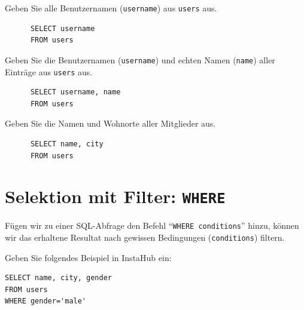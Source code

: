 \begin{myexercise}
  Geben Sie alle Benutzernamen (\texttt{username}) aus \texttt{users} aus.
  \begin{myanswer}
    \begin{lstlisting}
      SELECT username
      FROM users
      \end{lstlisting}
  \end{myanswer}
\end{myexercise}

\begin{myexercise}
  Geben Sie die Benutzernamen (\texttt{username}) und echten Namen (\texttt{name}) aller Einträge aus \texttt{users} aus.
  \begin{myanswer}
    \begin{lstlisting}
      SELECT username, name
      FROM users
    \end{lstlisting}
  \end{myanswer}
\end{myexercise}

\begin{myexercise}
  Geben Sie die Namen und Wohnorte aller Mitglieder aus.
  \begin{myanswer}
    \begin{lstlisting}
      SELECT name, city
      FROM users
    \end{lstlisting}
  \end{myanswer}
\end{myexercise}

\section{Selektion mit Filter: \texorpdfstring{\lstinline|WHERE|}{WHERE}}
Fügen wir zu einer \gls{SQL}-Abfrage den Befehl \enquote{\lstinline|WHERE conditions|} hinzu, können wir das erhaltene Resultat nach gewissen Bedingungen (\texttt{conditions}) filtern.

\begin{myexample}
Geben Sie folgendes Beispiel in InstaHub ein:

\begin{lstlisting}
SELECT name, city, gender
FROM users
WHERE gender='male'
\end{lstlisting}
\end{myexample}

